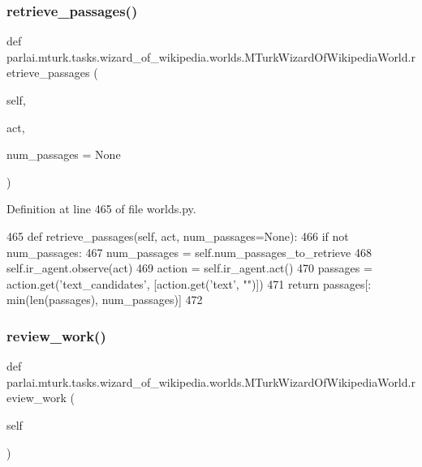 \subsubsection{\texorpdfstring{retrieve\+\_\+passages()}{retrieve\_passages()}}
{\footnotesize\ttfamily def parlai.\+mturk.\+tasks.\+wizard\+\_\+of\+\_\+wikipedia.\+worlds.\+M\+Turk\+Wizard\+Of\+Wikipedia\+World.\+retrieve\+\_\+passages (\begin{DoxyParamCaption}\item[{}]{self,  }\item[{}]{act,  }\item[{}]{num\+\_\+passages = {\ttfamily None} }\end{DoxyParamCaption})}



Definition at line 465 of file worlds.\+py.


\begin{DoxyCode}
465     \textcolor{keyword}{def }retrieve\_passages(self, act, num\_passages=None):
466         \textcolor{keywordflow}{if} \textcolor{keywordflow}{not} num\_passages:
467             num\_passages = self.num\_passages\_to\_retrieve
468         self.ir\_agent.observe(act)
469         action = self.ir\_agent.act()
470         passages = action.get(\textcolor{stringliteral}{'text\_candidates'}, [action.get(\textcolor{stringliteral}{'text'}, \textcolor{stringliteral}{""})])
471         \textcolor{keywordflow}{return} passages[: min(len(passages), num\_passages)]
472 
\end{DoxyCode}
\mbox{\label{classparlai_1_1mturk_1_1tasks_1_1wizard__of__wikipedia_1_1worlds_1_1MTurkWizardOfWikipediaWorld_adf9ddc1cbe8f2abc7f42995d621904bf}} 
\subsubsection{\texorpdfstring{review\+\_\+work()}{review\_work()}}
{\footnotesize\ttfamily def parlai.\+mturk.\+tasks.\+wizard\+\_\+of\+\_\+wikipedia.\+worlds.\+M\+Turk\+Wizard\+Of\+Wikipedia\+World.\+review\+\_\+work (\begin{DoxyParamCaption}\item[{}]{self }\end{DoxyParamCaption})}




